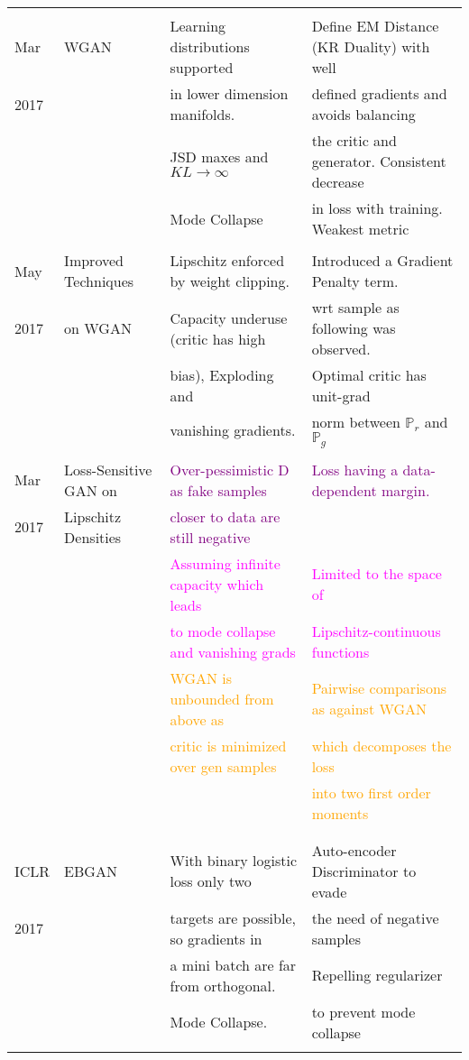 \begin{adjustbox}{max width = 9cm}
\begin{tabular}{|l|l|l|l|}
& & & \\
Mar & WGAN \cite{arjovskyWGAN}& Learning distributions supported& Define EM Distance (KR Duality) with well  \\
2017 && in lower dimension manifolds.& defined gradients and avoids balancing \\
&& JSD maxes and $KL\rightarrow\infty$& the critic and generator. Consistent decrease\\
&& Mode Collapse &in loss with training. Weakest metric\\
&&& \\
May & Improved Techniques &Lipschitz enforced by weight clipping. & Introduced a Gradient Penalty term. \\
2017 &on WGAN  \cite{gularajani} & Capacity underuse (critic has high & wrt sample as following was observed.\\
& & bias), Exploding and&Optimal critic has unit-grad \\
&& vanishing gradients. & norm between $\mathbb{P}_{r}$ and $\mathbb{P}_{g}$\\
& & & \\

Mar& Loss-Sensitive GAN on & \textcolor{purple}{Over-pessimistic D as fake samples} & \textcolor{purple}{Loss having a data-dependent margin.} \\
2017& Lipschitz Densities\cite{ls-gan}& \textcolor{purple}{closer to data are still negative} & \\
&&\textcolor{magenta}{Assuming infinite capacity which leads}& \textcolor{magenta}{Limited to the space of}\\
&&\textcolor{magenta}{to mode collapse and vanishing grads}&\textcolor{magenta}{Lipschitz-continuous functions}\\
&&\textcolor{orange}{WGAN is unbounded from above as} & \textcolor{orange}{Pairwise comparisons as against WGAN}\\
&& \textcolor{orange}{critic is minimized over gen samples}&\textcolor{orange}{which decomposes the loss}\\
&&&\textcolor{orange}{into two first order moments}\\
&&&\\
& & & \\
ICLR & EBGAN \cite{eb-gan} & With binary logistic loss only two & Auto-encoder Discriminator to evade    \\
2017 & &targets are possible, so gradients in & the need of negative samples \\
&&a mini batch are far from orthogonal.& Repelling regularizer \\
&&Mode Collapse.& to prevent mode collapse\\
& & & \\


\end{tabular}
\end{adjustbox}
